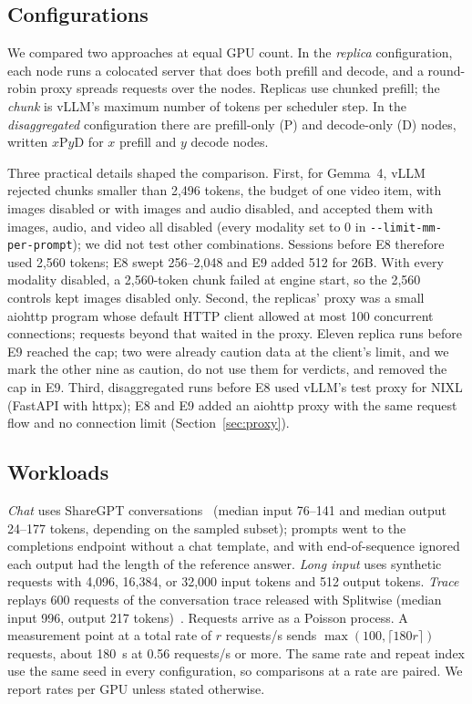 \documentclass[11pt]{article}
\begin{document}
\subsection{Configurations}\label{sec:config}
We compared two approaches at equal GPU count. In the \emph{replica} configuration, each node runs a colocated server that does both prefill and decode, and a round-robin proxy spreads requests over the nodes. Replicas use chunked prefill; the \emph{chunk} is vLLM's maximum number of tokens per scheduler step. In the \emph{disaggregated} configuration there are prefill-only (P) and decode-only (D) nodes, written $x$P$y$D for $x$ prefill and $y$ decode nodes.

Three practical details shaped the comparison. First, for Gemma~4, vLLM rejected chunks smaller than 2,496 tokens, the budget of one video item, with images disabled or with images and audio disabled, and accepted them with images, audio, and video all disabled (every modality set to 0 in \texttt{-{}-limit-mm-per-prompt}); we did not test other combinations. Sessions before E8 therefore used 2,560 tokens; E8 swept 256--2,048 and E9 added 512 for 26B. With every modality disabled, a 2,560-token chunk failed at engine start, so the 2,560 controls kept images disabled only. Second, the replicas' proxy was a small aiohttp program whose default HTTP client allowed at most 100 concurrent connections; requests beyond that waited in the proxy. Eleven replica runs before E9 reached the cap; two were already caution data at the client's limit, and we mark the other nine as caution, do not use them for verdicts, and removed the cap in E9. Third, disaggregated runs before E8 used vLLM's test proxy for NIXL (FastAPI with httpx); E8 and E9 added an aiohttp proxy with the same request flow and no connection limit (Section~\ref{sec:proxy}).

\subsection{Workloads}
\emph{Chat} uses ShareGPT conversations~\cite{sharegpt} (median input 76--141 and median output 24--177 tokens, depending on the sampled subset); prompts went to the completions endpoint without a chat template, and with end-of-sequence ignored each output had the length of the reference answer. \emph{Long input} uses synthetic requests with 4,096, 16,384, or 32,000 input tokens and 512 output tokens. \emph{Trace} replays 600 requests of the conversation trace released with Splitwise (median input 996, output 217 tokens)~\cite{azuretrace}. Requests arrive as a Poisson process. A measurement point at a total rate of $r$ requests/s sends $\max(100, \lceil 180r\rceil)$ requests, about 180~s at 0.56 requests/s or more. The same rate and repeat index use the same seed in every configuration, so comparisons at a rate are paired. We report rates per GPU unless stated otherwise.
\end{document}
